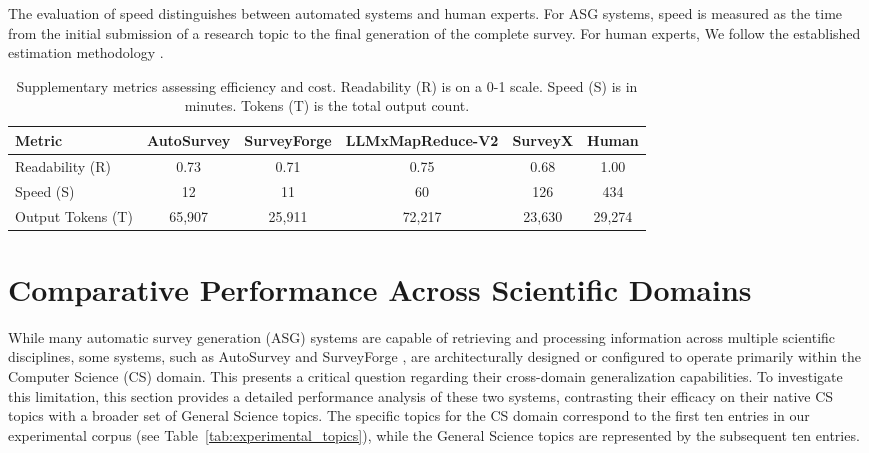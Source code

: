 \documentclass[11pt]{article}
\begin{document}
The evaluation of speed distinguishes between automated systems and human experts. For ASG systems, speed is measured as the time from the initial submission of a research topic to the final generation of the complete survey. For human experts, We follow the established estimation methodology \cite{wang2024autosurvey}.

\begin{table}[h!]
    \centering
    \caption{Supplementary metrics assessing efficiency and cost. Readability (R) is on a 0-1 scale. Speed (S) is in minutes. Tokens (T) is the total output count.}
    \label{tab:appendix_supplementary}
    \begin{tabular}{lccccc}
        \toprule
        \textbf{Metric} & \textbf{AutoSurvey} & \textbf{SurveyForge} & \textbf{LLMxMapReduce-V2} & \textbf{SurveyX} & \textbf{Human} \\
        \midrule
        Readability (R) & 0.73 & 0.71 & 0.75 & 0.68 & 1.00 \\
        Speed (S) & 12 & 11 & 60 & 126 & 434 \\
        Output Tokens (T) & 65,907 & 25,911 & 72,217 & 23,630 & 29,274 \\
        \bottomrule
    \end{tabular}
\end{table}




\section{Comparative Performance Across Scientific Domains}
\label{sec:appendix_domain_comparison}

While many automatic survey generation (ASG) systems are capable of retrieving and processing information across multiple scientific disciplines, some systems, such as AutoSurvey \citep{wang2024autosurvey} and SurveyForge \citep{yan2025surveyforge}, are architecturally designed or configured to operate primarily within the Computer Science (CS) domain. This presents a critical question regarding their cross-domain generalization capabilities. To investigate this limitation, this section provides a detailed performance analysis of these two systems, contrasting their efficacy on their native CS topics with a broader set of General Science topics. The specific topics for the CS domain correspond to the first ten entries in our experimental corpus (see Table~\ref{tab:experimental_topics}), while the General Science topics are represented by the subsequent ten entries.
\end{document}
